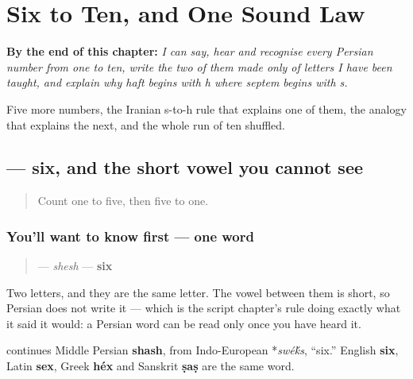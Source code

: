 
\chapter{Six to Ten, and One Sound Law}
\label{ch:fa-count-ten}

\begin{chapteropening}
\textbf{By the end of this chapter:} \emph{I can say, hear and recognise every Persian number from one to ten, write the two of them made only of letters I have been taught, and explain why haft begins with h where septem begins with s.}

Five more numbers, the Iranian s-to-h rule that explains one of them, the analogy that explains the next, and the whole run of ten shuffled.
\end{chapteropening}

\section[\texorpdfstring{\fa{شش} (shesh)}{شش (shesh)}]{ — six, and the short vowel you cannot see}

\label{lesson:FA-C17-shesh}



\begin{quote}
Count one to five, then five to one.
\end{quote}

\subsection*{You'll want to know first — one word}
\begin{quote}
\textbf{} — \emph{shesh} — \textbf{six}
\end{quote}

Two letters, and they are the same letter. The vowel between them is short, so Persian does not write it — which is the script chapter's rule doing exactly what it said it would: a Persian word can be read only once you have heard it.

\begin{cousinweb}
\textbf{} continues Middle Persian \textbf{shash}, from Indo-European *\emph{swé\'{k}s}, \textquotedblleft{}six.\textquotedblright{} English \textbf{six}, Latin \textbf{sex}, Greek \textbf{héx} and Sanskrit \textbf{ṣaṣ} are the same word.
\end{cousinweb}

